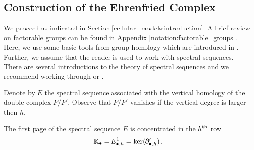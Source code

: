 \subsection{Construction of the Ehrenfried Complex}
We proceed as indicated in Section \ref{cellular_models:introduction}.
A brief review on factorable groups can be found in Appendix \ref{notation:factorable_groups}.
Here, we use some basic tools from group homology which are introduced in \cite{Brown198211}.
Further, we assume that the reader is used to work with spectral sequences.
There are several introductions to the theory of spectral sequences and we recommend working through \cite[Chapter 5]{Weibel1995} or \cite[Chapter 9]{Spanier199412}.

Denote by $E$ the spectral sequence associated with the vertical homology of the double complex $P/P'$.
Observe that $P/P'$ vanishes if the vertical degree is larger then $h$.
\begin{defthm}
    \label{cellular_models:ehrenfried:E1_is_concentrated_in_a_single_row}
    The first page of the spectral sequence $E$ is concentrated in the $h^{\text{th}}$ row
    \[
        \mathbb K_\bullet = E^1_{\bullet,h} = \ker( \partial'_{\bullet,h})\,. 
    \]
\end{defthm}

